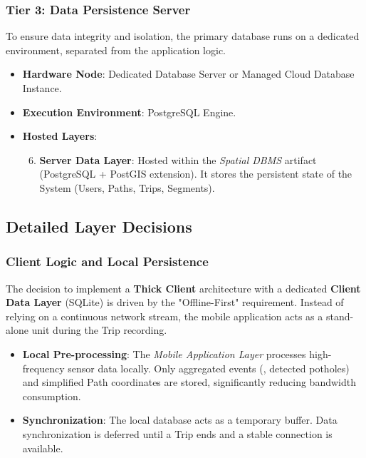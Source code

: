 \subsubsection*{Tier 3: Data Persistence Server}
To ensure data integrity and isolation, the primary database runs on a dedicated environment, separated from the application logic.
\begin{itemize}
    \item \textbf{Hardware Node}: Dedicated Database Server or Managed Cloud Database Instance.
    \item \textbf{Execution Environment}: PostgreSQL Engine.
    \item \textbf{Hosted Layers}:
    \begin{enumerate}
        \setcounter{enumi}{5} 
        \item \textbf{Server Data Layer}: Hosted within the \emph{Spatial DBMS} artifact (PostgreSQL + PostGIS extension). It stores the persistent state of the System (Users, Paths, Trips, Segments).
    \end{enumerate}
\end{itemize}

\subsection{Detailed Layer Decisions}
\subsubsection*{Client Logic and Local Persistence}
The decision to implement a \textbf{Thick Client} architecture with a dedicated \textbf{Client Data Layer} (SQLite) is driven by the "Offline-First" requirement. 
Instead of relying on a continuous network stream, the mobile application acts as a stand-alone unit during the Trip recording. 
\begin{itemize}
    \item \textbf{Local Pre-processing}: The \emph{Mobile Application Layer} processes high-frequency sensor data locally. Only aggregated events (\eg, detected potholes) and simplified Path coordinates are stored, significantly reducing bandwidth consumption.
    \item \textbf{Synchronization}: The local database acts as a temporary buffer. Data synchronization is deferred until a Trip ends and a stable connection is available.
\end{itemize}

